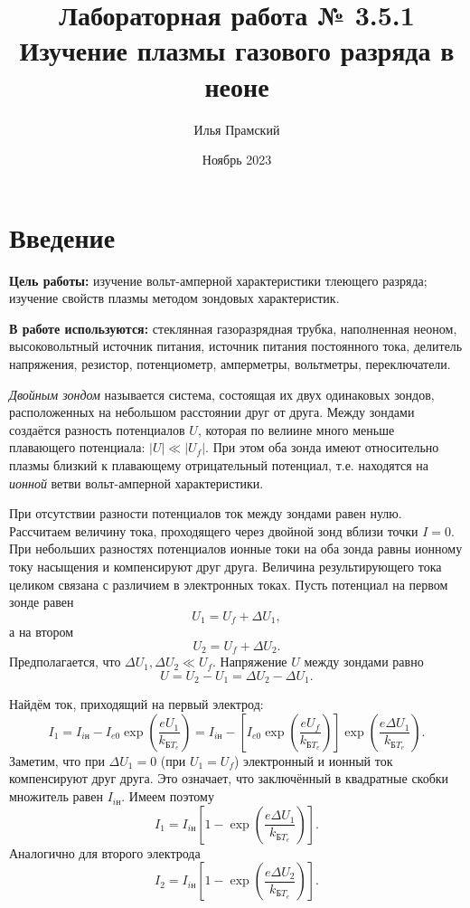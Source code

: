 \documentclass[a4paper,12pt]{article}
\title{Лабораторная работа № 3.5.1\\Изучение плазмы газового разряда в неоне}
\author{Илья Прамский}
\date{Ноябрь 2023}
\begin{document}
\maketitle
\newpage
\section*{Введение}
\begin{flushleft}
  \textbf{Цель работы:} изучение вольт-амперной характеристики тлеющего разряда; изучение свойств плазмы методом зондовых характеристик.
\end{flushleft}

\begin{flushleft}
  \textbf{В работе используются:} стеклянная газоразрядная трубка, наполненная неоном, высоковольтный источник питания, источник питания постоянного тока, делитель напряжения, резистор, потенциометр, амперметры, вольтметры, переключатели.
\end{flushleft}

\textit{Двойным зондом} называется система, состоящая их двух одинаковых зондов, расположенных на небольшом расстоянии друг от друга. Между зондами создаётся разность потенциалов $U$, которая по велиине много меньше плавающего потенциала: $\left|U\right|\ll\left|U_f\right|$. При этом оба зонда имеют относительно плазмы близкий к плавающему отрицательный потенциал, т.е. находятся на \textit{ионной} ветви вольт-амперной характеристики.

При отсутствии разности потенциалов ток между зондами равен нулю. Рассчитаем величину тока, проходящего через двойной зонд вблизи точки $I=0$. При небольших разностях потенциалов ионные токи на оба зонда равны ионному току насыщения и компенсируют друг друга. Величина результирующего тока целиком связана с различием в электронных токах. Пусть потенциал на первом зонде равен\[U_1=U_f+\Delta U_1,\]а на втором\[U_2=U_f+\Delta U_2.\]Предполагается, что $\Delta U_1,\Delta U_2\ll U_f$. Напряжение $U$ между зондами равно\[U=U_2-U_1=\Delta U_2-\Delta U_1.\]

Найдём ток, приходящий на первый электрод:\[I_1=I_{i\text{н}}-I_{e0}\exp{\left(\frac{eU_1}{k_{\text{Б}T_e}}\right)}=I_{i\text{н}}-\left[I_{e0}\exp{\left(\frac{eU_f}{k_{\text{Б}T_e}}\right)}\right]\exp{\left(\frac{e\Delta U_1}{k_{\text{Б}T_e}}\right)}.\]Заметим, что при $\Delta U_1=0$ (при $U_1=U_f$) электронный и ионный ток компенсируют друг друга. Это означает, что заключённый в квадратные скобки множитель равен $I_{i\text{н}}$. Имеем поэтому\[I_1=I_{i\text{н}}\left[1-\exp{\left(\frac{e\Delta U_1}{k_{\text{Б}T_e}}\right)}\right].\]Аналогично для второго электрода\[I_2=I_{i\text{н}}\left[1-\exp{\left(\frac{e\Delta U_2}{k_{\text{Б}T_e}}\right)}\right].\]
\end{document}
